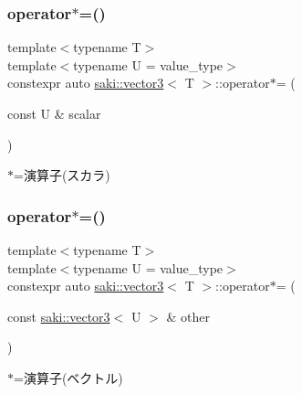 \subsubsection{\texorpdfstring{operator$\ast$=()}{operator*=()}\hspace{0.1cm}{\footnotesize\ttfamily [1/2]}}
{\footnotesize\ttfamily template$<$typename T$>$ \\
template$<$typename U  = value\+\_\+type$>$ \\
constexpr auto \mbox{\hyperlink{classsaki_1_1vector3}{saki\+::vector3}}$<$ T $>$\+::operator$\ast$= (\begin{DoxyParamCaption}\item[{const U \&}]{scalar }\end{DoxyParamCaption})\hspace{0.3cm}{\ttfamily [inline]}}



$\ast$=演算子(スカラ) 

\mbox{\label{classsaki_1_1vector3_acb87d334559aa5e1da12e680193eba84}} 
\subsubsection{\texorpdfstring{operator$\ast$=()}{operator*=()}\hspace{0.1cm}{\footnotesize\ttfamily [2/2]}}
{\footnotesize\ttfamily template$<$typename T$>$ \\
template$<$typename U  = value\+\_\+type$>$ \\
constexpr auto \mbox{\hyperlink{classsaki_1_1vector3}{saki\+::vector3}}$<$ T $>$\+::operator$\ast$= (\begin{DoxyParamCaption}\item[{const \mbox{\hyperlink{classsaki_1_1vector3}{saki\+::vector3}}$<$ U $>$ \&}]{other }\end{DoxyParamCaption})\hspace{0.3cm}{\ttfamily [inline]}}



$\ast$=演算子(ベクトル) 

\mbox{\label{classsaki_1_1vector3_a8417faf227247d5062195eb6d8a513fc}} 

